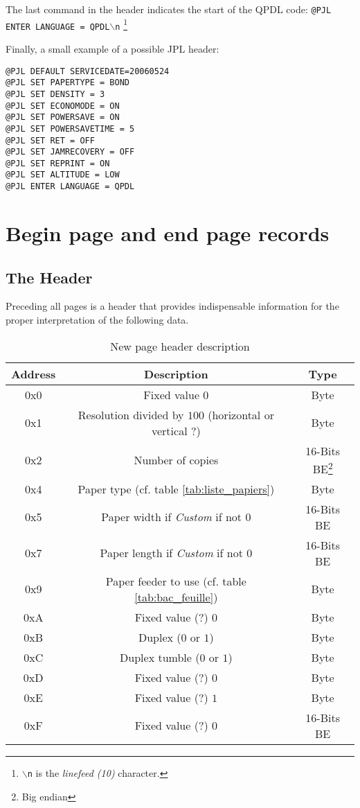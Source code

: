 The last command in the header indicates the start of the QPDL code:
\texttt{@PJL ENTER LANGUAGE = QPDL$\backslash$n}
\footnote{\texttt{$\backslash$n} is the \emph{linefeed (10)} character.}
\medskip

Finally, a small example of a possible JPL header:
\begin{verbatim}
@PJL DEFAULT SERVICEDATE=20060524
@PJL SET PAPERTYPE = BOND
@PJL SET DENSITY = 3
@PJL SET ECONOMODE = ON
@PJL SET POWERSAVE = ON
@PJL SET POWERSAVETIME = 5
@PJL SET RET = OFF
@PJL SET JAMRECOVERY = OFF
@PJL SET REPRINT = ON
@PJL SET ALTITUDE = LOW
@PJL ENTER LANGUAGE = QPDL
\end{verbatim}




\section{Begin page and end page records}


\subsection{The Header}
Preceding all pages is a header that provides indispensable information
for the proper interpretation of the following data.

\begin{table}[!ht]
\centering
\begin{tabular}{| c | c | c |}
\hline
\textbf{Address} & \textbf{Description} & \textbf{Type} \\
\hline
\hline
0x0 & Fixed value $0$ & Byte \\
0x1 & Resolution divided by $100$ (horizontal or vertical ?) & Byte \\
0x2 & Number of copies & 16-Bits BE\footnote{Big endian} \\
0x4 & Paper type (cf. table \ref{tab:liste_papiers}) & Byte \\
0x5 & Paper width if \emph{Custom} if not $0$ & 16-Bits BE \\
0x7 & Paper length if \emph{Custom} if not $0$ & 16-Bits BE \\
0x9 & Paper feeder to use  (cf. table \ref{tab:bac_feuille}) & Byte \\
0xA & Fixed value (?) $0$ & Byte \\
0xB & Duplex ($0$ or $1$) & Byte \\
0xC & Duplex tumble ($0$ or $1$) & Byte \\
0xD & Fixed value (?) $0$ & Byte \\
0xE & Fixed value (?) $1$ & Byte \\
0xF & Fixed value (?) $0$ & 16-Bits BE\\
\hline
\end{tabular}
\caption{New page header description}
\label{tab:entete_page}
\end{table}

